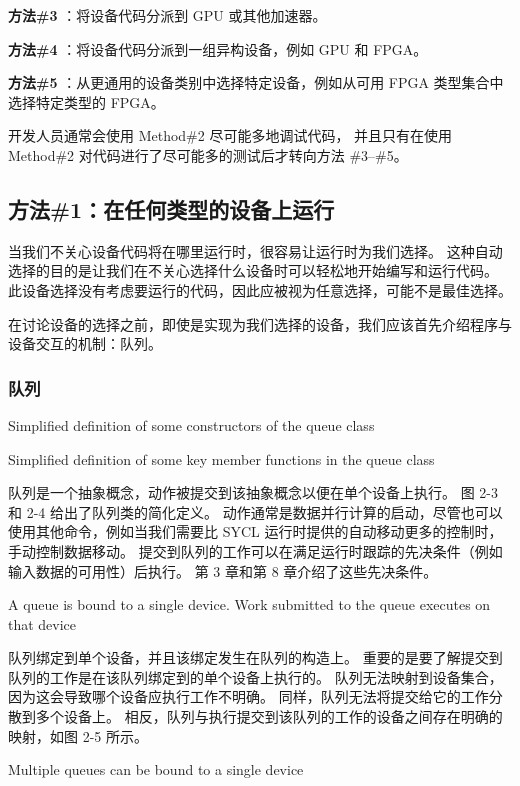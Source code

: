 \textbf{方法\#3} ：将设备代码分派到 GPU 或其他加速器。

\textbf{方法\#4} ：将设备代码分派到一组异构设备，例如 GPU 和 FPGA。

\textbf{方法\#5} ：从更通用的设备类别中选择特定设备，例如从可用 FPGA 类型集合中选择特定类型的 FPGA。

\begin{remark}
	开发人员通常会使用 Method\#2 尽可能多地调试代码，
	并且只有在使用 Method\#2 对代码进行了尽可能多的测试后才转向方法 \#3–\#5。
\end{remark}

\subsection{方法\#1：在任何类型的设备上运行}
当我们不关心设备代码将在哪里运行时，很容易让运行时为我们选择。 
这种自动选择的目的是让我们在不关心选择什么设备时可以轻松地开始编写和运行代码。 
此设备选择没有考虑要运行的代码，因此应被视为任意选择，可能不是最佳选择。

在讨论设备的选择之前，即使是实现为我们选择的设备，我们应该首先介绍程序与设备交互的机制：队列。

\subsubsection{队列}
{\color{red} Simplified definition of some constructors of the queue class }

{\color{red} Simplified definition of some key member functions in the queue class }

队列是一个抽象概念，动作被提交到该抽象概念以便在单个设备上执行。 图 2-3 和 2-4 给出了队列类的简化定义。 
动作通常是数据并行计算的启动，尽管也可以使用其他命令，例如当我们需要比 SYCL 运行时提供的自动移动更多的控制时，
手动控制数据移动。 提交到队列的工作可以在满足运行时跟踪的先决条件（例如输入数据的可用性）后执行。 
第 3 章和第 8 章介绍了这些先决条件。

{\color{red} A queue is bound to a single device. Work submitted to the queue executes on that device }

队列绑定到单个设备，并且该绑定发生在队列的构造上。 重要的是要了解提交到队列的工作是在该队列绑定到的单个设备上执行的。 
队列无法映射到设备集合，因为这会导致哪个设备应执行工作不明确。 同样，队列无法将提交给它的工作分散到多个设备上。 
相反，队列与执行提交到该队列的工作的设备之间存在明确的映射，如图 2-5 所示。

{\color{red} Multiple queues can be bound to a single device } 

